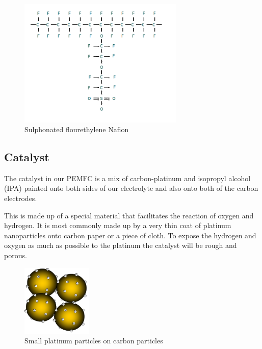 \begin{figure}[h]
    \centering
    \includegraphics[width=0.7\textwidth]{DIV./Bilder/polymersheet.png}
    \caption{Sulphonated flourethylene Nafion \cite{PemLectue}}
    \label{fig:Nafion}
\end{figure}

\subsection{Catalyst}
The catalyst in our PEMFC is a mix of carbon-platinum and isopropyl alcohol (IPA) painted onto both sides of our electrolyte and also onto both of the carbon electrodes.

This is made up of a special material that facilitates the reaction of oxygen and hydrogen. It is most commonly made up by a very thin coat of platinum nanoparticles onto carbon paper or a piece of cloth. To expose the hydrogen and oxygen as much as possible to the platinum the catalyst will be rough and porous. 

\begin{figure}
  \begin{center}
    \includegraphics[width=0.3\textwidth]{DIV./Bilder/Catalyst.png}
  \end{center}
  \caption{Small platinum particles on carbon particles \cite{PemLectue}}
\end{figure}